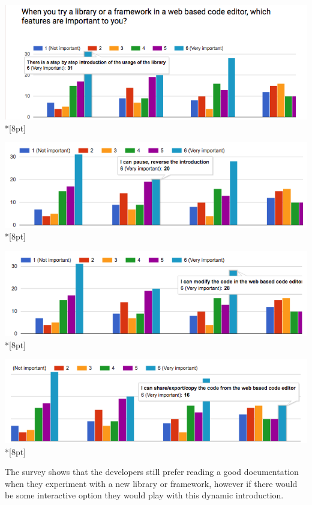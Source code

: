 \documentclass[11pt, a4paper, oneside, openright, medskipamount]{report}
\begin{document}
\includegraphics[width=1\textwidth]{assets/survey-result/features-stepbystep.png}\\*[8pt]

\includegraphics[width=1\textwidth]{assets/survey-result/features-paused.png}\\*[8pt]

\includegraphics[width=1\textwidth]{assets/survey-result/features-modify-code.png}\\*[8pt]

\includegraphics[width=1\textwidth]{assets/survey-result/features-sharing.png}\\*[8pt]

The survey shows that the developers still prefer reading a good documentation when they experiment with a new library or framework, however if there would be some interactive option they would play with this dynamic introduction.
\end{document}
